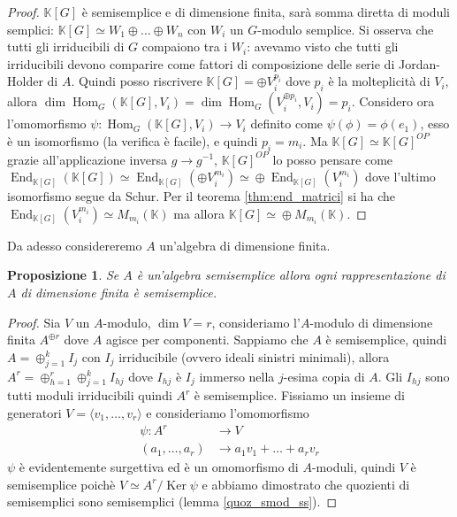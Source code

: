 \documentclass[11pt]{article}
\theoremstyle{plain}
\newtheorem{prop}[thm]{Proposizione}
\theoremstyle{definition}
\theoremstyle{remark}
\newcommand{\K}{\mathbb{K}}
\DeclareMathOperator{\Hom}{Hom}
\DeclareMathOperator{\End}{End}
\DeclareMathOperator{\Ker}{Ker}
\DeclareMathOperator{\iso}{\simeq}
\begin{document}
\begin{proof}
	$\K[G]$ è semisemplice e di dimensione finita, sarà somma diretta di moduli semplici: $\K[G]\iso W_1\oplus \ldots\oplus W_n$ con $W_i$ un $G$-modulo semplice. Si osserva che tutti gli irriducibili di $G$ compaiono tra i $W_i$: avevamo visto che tutti gli irriducibili devono comparire come fattori di composizione delle serie di Jordan-Holder di $A$. Quindi posso riscrivere $\K[G] = \oplus V_i^{p_i}$ dove $p_i$ è la molteplicità di $V_i$, allora $\dim \Hom_G(\K[G],V_i) = \dim\Hom_G(V_i^{\oplus p_i},V_i) = p_i$. Considero ora l'omomorfismo $\psi:\Hom_G(\K[G],V_i)\to V_i$ definito come $\psi(\phi) = \phi(e_1)$, esso è un isomorfismo (la verifica è facile), e quindi $p_i = m_i$. Ma $\K[G]\iso \K[G]^{OP}$ grazie all'applicazione inversa $g\to g^{-1}$, $\K[G]^{OP}$ lo posso pensare come $\End_{\K[G]}(\K[G]) \iso \End_{\K[G]}(\oplus V_i^{m_i}) \iso \oplus\End_{\K[G]}(V_i^{m_i})$ dove l'ultimo isomorfismo segue da Schur. Per il teorema \ref{thm:end_matrici} si ha che $\End_{\K[G]}(V_i^{m_i}) \iso M_{m_i}(\K)$ ma allora $\K[G] \iso \oplus M_{m_i}(\K)$.
\end{proof}

Da adesso considereremo $A$ un'algebra di dimensione finita.
\begin{prop}
	Se $A$ è un'algebra semisemplice allora ogni rappresentazione di $A$ di dimensione finita è semisemplice.
\end{prop}


\begin{proof}
	Sia $V$ un $A$-modulo, $\dim V = r$, consideriamo l'$A$-modulo di dimensione finita $A^{\oplus r}$ dove $A$ agisce per componenti. Sappiamo che $A$ è semisemplice, quindi $A=\oplus_{j=1}^{k} I_j$ con $I_j$ irriducibile (ovvero ideali sinistri minimali), allora $A^r=\oplus_{h=1}^{r}\oplus_{j=1}^{k} I_{hj}$ dove $I_{hj}$ è $I_j$ immerso nella $j$-esima copia di $A$. Gli $I_{hj}$ sono tutti moduli irriducibili quindi $A^r$ è semisemplice. Fissiamo un insieme di generatori $V=\langle v_1,\ldots,v_r\rangle$ e consideriamo l'omomorfismo
	\begin{align*}
		\psi:A^r&\to V\\
		(a_1,\ldots,a_r)&\to a_1v_1+\ldots+a_rv_r
	\end{align*}
	$\psi$ è evidentemente surgettiva ed è un omomorfismo di $A$-moduli, quindi $V$ è semisemplice poichè $V\iso A^r/\Ker \psi$ e abbiamo dimostrato che quozienti di semisemplici sono semisemplici (lemma \ref{quoz_smod_ss}).
\end{proof}
\end{document}
